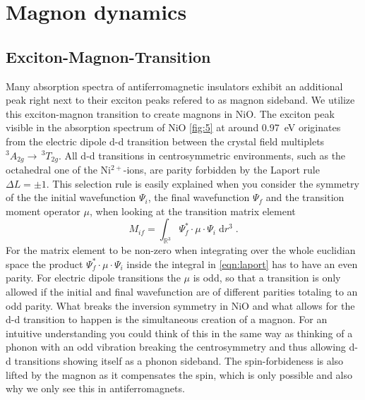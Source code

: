 \section{Magnon dynamics} 
\subsection{Exciton-Magnon-Transition}
\label{sec:x_m}
Many absorption spectra of antiferromagnetic insulators exhibit an additional peak right next to their exciton peaks  refered to as magnon sideband.
We utilize this exciton-magnon transition to create magnons in NiO.
The exciton peak visible in the absorption spectrum of NiO \autoref{fig:5} at around \qty{0.97}{eV} originates from the electric dipole d-d transition between the crystal field multiplets $^3A_{2g} \rightarrow \, ^3T_{2g}$.
All d-d transitions in centrosymmetric environments, such as the octahedral one of the Ni$^{2+}$-ions, are parity forbidden by the Laport rule $\Delta L = \pm 1$.
This selection rule is easily explained when you consider the symmetry of the the initial wavefunction $\Psi_i$, the final wavefunction $\Psi_f$ and the transition moment operator $\mu$, when looking at the transition matrix element
\begin{equation}
    M_{if} = \int_{\mathbb{R}^3} \Psi^*_f \cdot \mu \cdot \Psi_i \;\text{d}r^3 \;.
    \label{eqn:laport}
\end{equation}
For the matrix element to be non-zero when integrating over the whole euclidian space the product $\Psi^*_f \cdot \mu \cdot \Psi_i$ inside the integral in \autoref{eqn:laport} has to have an even parity.
For electric dipole transitions the $\mu$ is odd, so that a transition is only allowed if the initial and final wavefunction are of different parities totaling to an odd parity.
What breaks the inversion symmetry in NiO and what allows for the d-d transition to happen is the simultaneous creation of a magnon.
For an intuitive understanding you could think of this in the same way as thinking of a phonon with an odd vibration breaking the centrosymmetry and thus allowing d-d transitions showing itself as a phonon sideband.
The spin-forbideness is also lifted by the magnon as it compensates the spin, which is only possible and also why we only see this in antiferromagnets.
